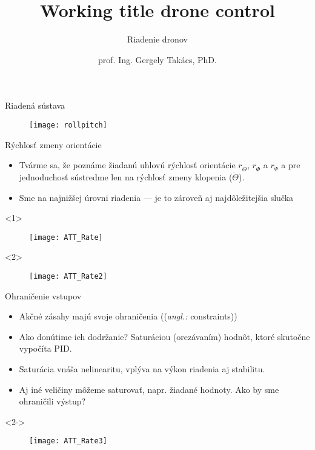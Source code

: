 \documentclass{beamer}
\title[Riadiace Algoritmy Dronov]
{Working title drone control}
\subtitle{\vspace{1em}Riadenie dronov}
\author[]{prof. Ing. Gergely Takács, PhD.}
\date[07.12.2021]{}
\newcommand{\angl}[1]{{\color{gray}(\emph{angl.:} #1)}}
\begin{document}



%

\begin{frame}{Riadená sústava}
\begin{figure}
\centering
  \texttt{[image: rollpitch]}\\
\end{figure}
\end{frame}


\begin{frame}[t]{Rýchlosť zmeny orientácie}
\begin{itemize}
  \item<1-> Tvárme sa, že poznáme žiadanú uhlovú rýchlosť orientácie $r_{\dot{\Theta}}$, $r_{\dot{\Phi}}$ a $r_{\dot{\Psi}}$ a pre jednoduchosť sústredme len na rýchlosť zmeny klopenia ($\dot{\Theta}$).
  \item<2-> Sme na najnižšej úrovni riadenia --- je to zároveň aj najdôležitejšia slučka \citep{AP:PID}
  \end{itemize}

  \begin{onlyenv}<1>
  \begin{figure}
\centering
  \texttt{[image: ATT\_Rate]}\\
\end{figure}
\end{onlyenv}

  \begin{onlyenv}<2>
  \begin{figure}
\centering
  \texttt{[image: ATT\_Rate2]}\\
\end{figure}
\end{onlyenv}

  \end{frame}

\begin{frame}[t]{Ohraničenie vstupov}
  \begin{itemize}
    \item<1-> Akčné zásahy majú svoje ohraničenia (\angl{constraints})
    \item<2-> Ako donútime ich dodržanie? Saturáciou (orezávaním) hodnôt, ktoré skutočne vypočíta PID.
    \item<3-> Saturácia vnáša nelinearitu, vplýva na výkon riadenia aj stabilitu.
    \item<4-> Aj iné veličiny môžeme saturovať, napr. žiadané hodnoty. Ako by sme ohraničili výstup?
  \end{itemize}

    \begin{onlyenv}<2->
  \begin{figure}
\centering
  \texttt{[image: ATT\_Rate3]}\\
\end{figure}
\end{onlyenv}
\end{frame}
\end{document}
